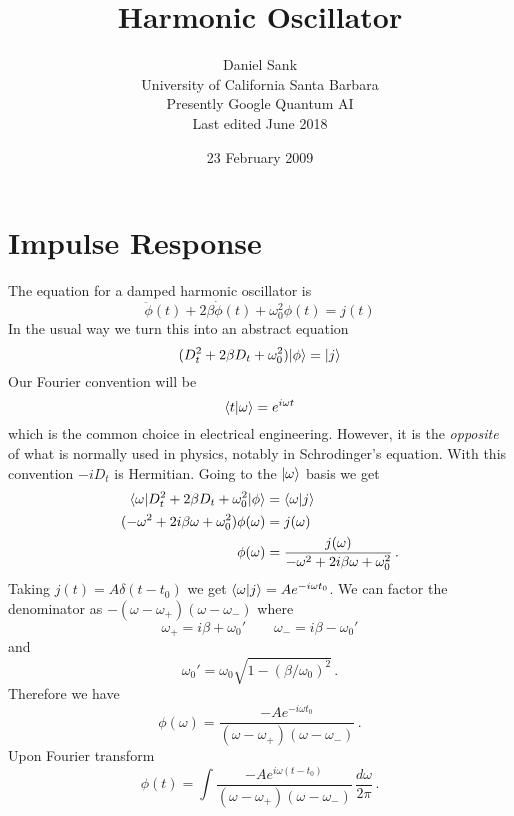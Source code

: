 \documentclass{article}
\title{Harmonic Oscillator}
\author{Daniel Sank \\ \small{University of California Santa Barbara} \\ \small{Presently Google Quantum AI} \\ \small{Last edited June 2018}}
\date{23 February 2009}
\begin{document}
\maketitle

\section{Impulse Response}

The equation for a damped harmonic oscillator is \begin{equation}
\ddot{\phi}(t)+2\beta\dot{\phi}(t)+\omega_{0}^{2}\phi(t)=j(t) \end{equation}
In the usual way we turn this into an abstract equation \begin{equation}
(D_{t}^{2}+2\beta D_{t}+\omega_{0}^{2})| \phi \rangle=| j \rangle \end{equation}
Our Fourier convention will be
\begin{equation}
\langle t|\omega\rangle=e^{i\omega t}
\end{equation}
which is the common choice in electrical engineering.
However, it is the \emph{opposite} of what is normally used in physics, notably in Schrodinger's equation.
With this convention $-iD_t$ is Hermitian.
Going to the $| \omega \rangle$ basis we get
\begin{align}
\langle \omega | D_t^2 + 2\beta D_t + \omega_0^2 | \phi \rangle &= \langle \omega|j\rangle \\
(-\omega^{2} + 2 i \beta\omega + \omega_{0}^{2}) \phi(\omega) & = j(\omega)\\
\phi(\omega) & = \frac{j(\omega)}{-\omega^{2} + 2 i \beta \omega + \omega_{0}^{2}} \, .
\end{align}
Taking $j(t)=A\delta(t-t_{0})$ we get $\langle \omega|j\rangle = A e^{-i \omega t_{0}}$.
We can factor the denominator as $-(\omega-\omega_{+})(\omega-\omega_{-})$
where
\begin{equation}
\omega_{+} = i \beta + \omega_0' \qquad \omega_{-} = i \beta - \omega_0' \label{eq:omega_plus_minus}
\end{equation}
and
\begin{equation}
\omega_0' = \omega_0 \sqrt{ 1 - \left( \beta / \omega_0 \right) ^2 } \, .
\end{equation}
Therefore we have \begin{equation}
\phi(\omega) = \frac{-A e^{-i \omega t_0}}{(\omega - \omega_{+})(\omega-\omega_{-})} \, .
\end{equation}
Upon Fourier transform
\begin{equation}
\phi(t) = 
\int\frac{-Ae^{i \omega(t - t_0)}}{(\omega-\omega_{+})(\omega-\omega_{-})} \,
\frac{d\omega}{2\pi} \, .
\end{equation}
\end{document}
